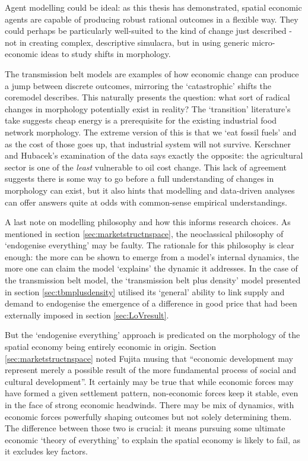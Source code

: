 Agent modelling could be ideal: as this thesis has demonstrated, spatial economic agents are capable of producing robust rational outcomes in a flexible way. They could perhaps be particularly well-suited to the kind of change just described - not in creating complex, descriptive simulacra, but in using generic micro-economic ideas to study shifts in morphology.

The transmission belt models are examples of how economic change can produce a jump between discrete outcomes, mirroring the `catastrophic' shifts the \gls{coremodel} describes. This naturally presents the question: what sort of radical changes in morphology potentially exist in reality? The `transition' literature's take suggests cheap energy is a prerequisite for the existing industrial food network morphology. The extreme version of this is that we `eat fossil fuels' and as the cost of those goes up, that industrial system will not survive. Kerschner and Hubacek's examination of the data says exactly the opposite: the agricultural sector is one of the \emph{least} vulnerable to oil cost change. This lack of agreement suggests there is some way to go before a full understanding of changes in morphology can exist, but it also hints that modelling and data-driven analyses can offer answers quite at odds with common-sense empirical understandings.

A last note on modelling philosophy and how this informs research choices. As mentioned in section \ref{sec:marketstructnspace}, the neoclassical philosophy of `endogenise everything' may be faulty. The rationale for this philosophy is clear enough: the more can be shown to emerge from a model's internal dynamics, the more one can claim the model `explains' the dynamic it addresses. In the case of the transmission belt model, the `transmission belt plus density' model presented in section \ref{sec:tbmplusdensity} utilised its `general' ability to link supply and demand to endogenise the emergence of a difference in good price that had been externally imposed in section \ref{sec:LoVresult}. 

But the `endogenise everything' approach is predicated on the morphology of the spatial economy being entirely economic in origin. Section \ref{sec:marketstructnspace} noted Fujita musing that ``economic development may represent merely a possible result of the more fundamental process of social and cultural development''. It certainly may be true that while economic forces may have formed a given settlement pattern, non-economic forces keep it stable, even in the face of strong economic headwinds. There may be mix of dynamics, with economic forces powerfully shaping outcomes but not solely determining them. The difference between those two is crucial: it means pursuing some ultimate economic `theory of everything' to explain the spatial economy is likely to fail, as it excludes key factors.


